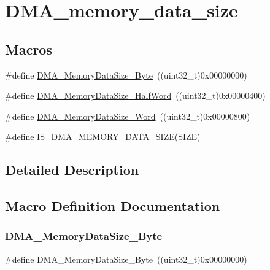\hypertarget{group___d_m_a__memory__data__size}{}\section{D\+M\+A\+\_\+memory\+\_\+data\+\_\+size}
\label{group___d_m_a__memory__data__size}
\subsection*{Macros}
\begin{DoxyCompactItemize}
\item 
\#define \mbox{\hyperlink{group___d_m_a__memory__data__size_gad6093bccb60ff9adf81e21c73c58ba17}{D\+M\+A\+\_\+\+Memory\+Data\+Size\+\_\+\+Byte}}~((uint32\+\_\+t)0x00000000)
\item 
\#define \mbox{\hyperlink{group___d_m_a__memory__data__size_ga74c9b4e547f5eaaf35d4fd3d01ed5741}{D\+M\+A\+\_\+\+Memory\+Data\+Size\+\_\+\+Half\+Word}}~((uint32\+\_\+t)0x00000400)
\item 
\#define \mbox{\hyperlink{group___d_m_a__memory__data__size_gaff403722a6f82d4b34c9ef306507bb98}{D\+M\+A\+\_\+\+Memory\+Data\+Size\+\_\+\+Word}}~((uint32\+\_\+t)0x00000800)
\item 
\#define \mbox{\hyperlink{group___d_m_a__memory__data__size_gac9e3748cebcb16d4ae4206d562bc804c}{I\+S\+\_\+\+D\+M\+A\+\_\+\+M\+E\+M\+O\+R\+Y\+\_\+\+D\+A\+T\+A\+\_\+\+S\+I\+ZE}}(S\+I\+ZE)
\end{DoxyCompactItemize}


\subsection{Detailed Description}


\subsection{Macro Definition Documentation}
\mbox{\label{group___d_m_a__memory__data__size_gad6093bccb60ff9adf81e21c73c58ba17}} 
\subsubsection{\texorpdfstring{DMA\_MemoryDataSize\_Byte}{DMA\_MemoryDataSize\_Byte}}
{\footnotesize\ttfamily \#define D\+M\+A\+\_\+\+Memory\+Data\+Size\+\_\+\+Byte~((uint32\+\_\+t)0x00000000)}

